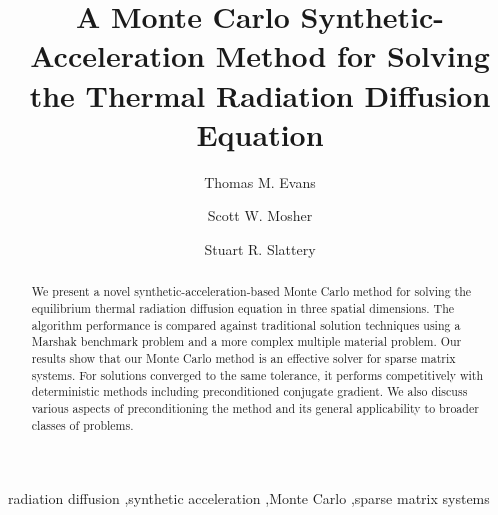 \documentclass[preprint,12pt]{elsarticle}
\begin{document}
\begin{frontmatter}

  \title{A Monte Carlo Synthetic-Acceleration Method for Solving the Thermal
    Radiation Diffusion Equation}

  \author[ornl]{Thomas M. Evans} 

  \author[ornl]{Scott W. Mosher} 

  \author[wisc]{Stuart R. Slattery} 

   

  \address[ornl]{Oak Ridge National Laboratory, 1 Bethel Valley Rd., Oak
    Ridge, TN 37831 U.S.A.}  \address[wisc]{University of Wisconsin-Madison,
    1500 Engineering Dr., Madison, WI 53716 U.S.A.}

  \begin{abstract}

    We present a novel synthetic-acceleration-based Monte Carlo method for
    solving the equilibrium thermal radiation diffusion equation in three
    spatial dimensions. The algorithm performance is compared against
    traditional solution techniques using a Marshak benchmark problem and a
    more complex multiple material problem. Our results show that our Monte
    Carlo method is an effective solver for sparse matrix systems. For
    solutions converged to the same tolerance, it performs competitively with
    deterministic methods including preconditioned conjugate gradient. We also
    discuss various aspects of preconditioning the method and its general
    applicability to broader classes of problems.

  \end{abstract}

  \begin{keyword}
    radiation diffusion \sep synthetic acceleration \sep Monte Carlo
    \sep sparse matrix systems
  \end{keyword}

\end{frontmatter}
\end{document}
